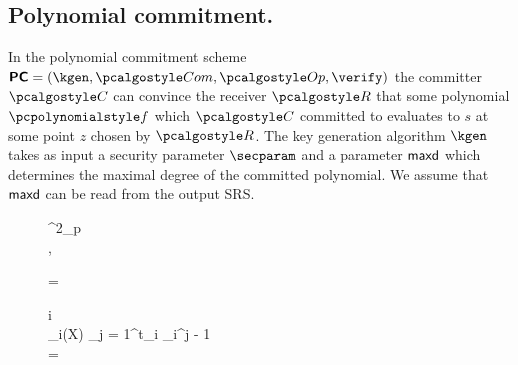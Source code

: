 \documentclass[runningheads,11pt]{llncs}
\begin{document}
\subsection{Polynomial commitment.}
\label{sec:poly_com}
In the polynomial commitment scheme $\PCOM = (\kgen, \com, \open, \verify)$ the
committer $\committer$ can convince the receiver $\receiver$ that some
polynomial $\p{f}$ which $\committer$ committed to evaluates to $s$ at some
point $z$ chosen by $\receiver$.  The key generation algorithm $\kgen$ takes as
input a security parameter $\secparam$ and a parameter $\mathsf{maxd}$ which
determines the maximal degree of the committed polynomial. We assume that
$\mathsf{maxd}$ can be read from the output SRS.
%
\begin{figure}
	\begin{pcvstack}
		\begin{pchstack}
			\procedure{$\kgen(\secparam, \maxdeg)$}
			{
			\chi \sample \FF^2_p \\ [\myskip]
			\pcreturn {}, \gtwo{\chi}\\ [\myskip]
				\hphantom{\hspace*{5.5cm}}	
      }
			
			\pchspace
			
			{ 
				\pcreturn {} = \\ [\myskip]
			}
		\end{pchstack}
    
		\begin{pchstack}
			\procedure{$\open(\srs, \vec{\gamma}, \vec{z}, \vec{s}, \vec{\p{f}}(X))$}
			{
			\pcfor i \in {} \pcdo\\ [\myskip]
      \pcind {}_i(X) \gets \sum_{j = 1}^{t_i} \gamma_i^{j - 1}
      \\ [\myskip] \pcreturn
       = \\ [\myskip]
				\hphantom{\hspace*{5.5cm}}	
			}
			

\end{pchstack}
\end{pcvstack}
\end{figure}
\end{document}
